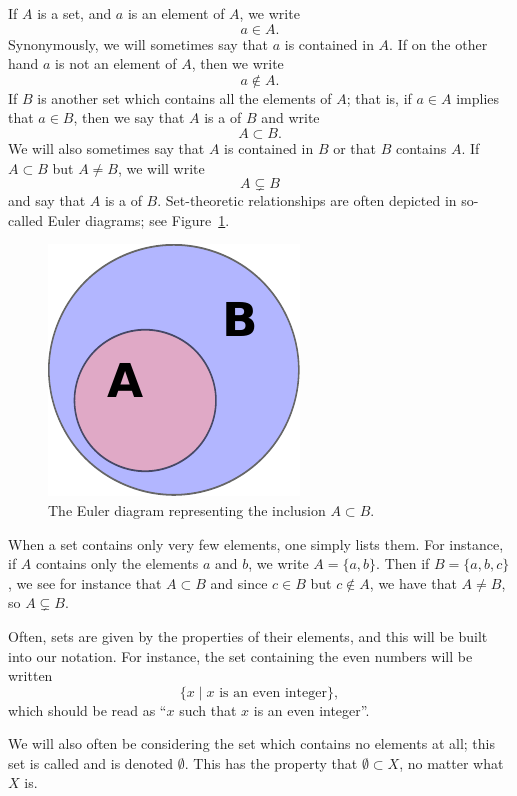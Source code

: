 If $A$ is a set, and $a$ is an element of $A$, we write
\[
  a \in A.
\]
Synonymously, we will sometimes say that $a$ is contained in $A$. If on the other hand $a$ is not an element of $A$, then we write
\[
  a \notin A.
\]
If $B$ is another set which contains all the elements of $A$; that is, if $a \in A$ implies that $a \in B$, then we say that $A$ is a  of $B$ and write
\[
  A \subset B.
\]
We will also sometimes say that $A$ is contained in $B$ or that $B$ contains $A$. If $A \subset B$ but $A \not= B$, we will write
\[
  A \subsetneq B
\]
and say that $A$ is a  of $B$. Set-theoretic relationships are often depicted in so-called Euler diagrams; see Figure~\ref{eulersubset}.
\begin{figure}
  \centering
  \includegraphics{images/subset.pdf}
  \caption{The Euler diagram representing the inclusion $A \subset B$.}
  \label{eulersubset}
\end{figure}
\begin{example}
  When a set contains only very few elements, one simply lists them. For instance, if $A$ contains only the elements $a$ and $b$, we write $A = \{ a, b\}$. Then if $B = \{ a, b, c\}$, we see for instance that $A \subset B$ and since $c \in B$ but $c \notin A$, we have that $A \not= B$, so $A \subsetneq B$.
  
  Often, sets are given by the properties of their elements, and this will be built into our notation. For instance, the set containing the even numbers will be written
  \[
    \{ x \mid \text{$x$ is an even integer} \},
  \]
  which should be read as ``$x$ such that $x$ is an even integer''.
  
  We will also often be considering the set which contains no elements at all; this set is called  and is denoted $\emptyset$. This has the property that $\emptyset \subset X$, no matter what $X$ is.
\end{example}
